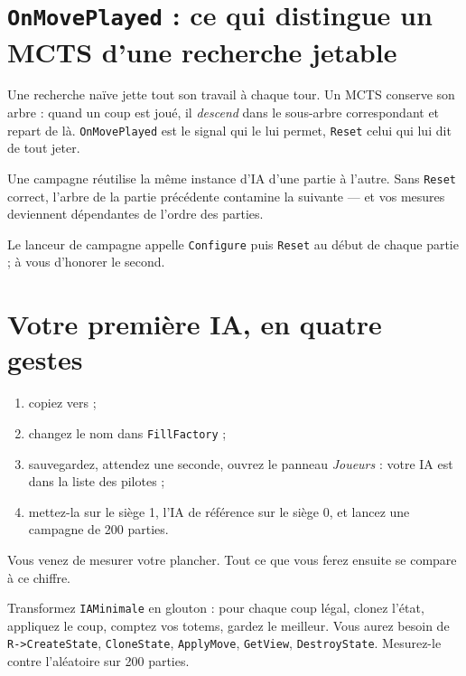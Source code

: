 \section{\texttt{OnMovePlayed} : ce qui distingue un MCTS d'une recherche jetable}

Une recherche naïve jette tout son travail à chaque tour. Un MCTS conserve son
arbre : quand un coup est joué, il \emph{descend} dans le sous-arbre
correspondant et repart de là. \texttt{OnMovePlayed} est le signal qui le lui
permet, \texttt{Reset} celui qui lui dit de tout jeter.

\begin{nkpiege}
Une campagne réutilise la même instance d'IA d'une partie à l'autre. Sans
\texttt{Reset} correct, l'arbre de la partie précédente contamine la suivante — et
vos mesures deviennent dépendantes de l'ordre des parties.

Le lanceur de campagne appelle \texttt{Configure} puis \texttt{Reset} au début de
chaque partie ; à vous d'honorer le second.
\end{nkpiege}

\section{Votre première IA, en quatre gestes}

\begin{enumerate}
  \item copiez  vers
         ;
  \item changez le nom dans \texttt{FillFactory} ;
  \item sauvegardez, attendez une seconde, ouvrez le panneau \emph{Joueurs} :
        votre IA est dans la liste des pilotes ;
  \item mettez-la sur le siège 1, l'IA de référence sur le siège 0, et lancez une
        campagne de 200 parties.
\end{enumerate}

Vous venez de mesurer votre plancher. Tout ce que vous ferez ensuite se compare à
ce chiffre.

\begin{nkexo}[1 — Le glouton]
Transformez \texttt{IAMinimale} en glouton : pour chaque coup légal, clonez
l'état, appliquez le coup, comptez vos totems, gardez le meilleur. Vous aurez
besoin de \texttt{R->CreateState}, \texttt{CloneState}, \texttt{ApplyMove},
\texttt{GetView}, \texttt{DestroyState}. Mesurez-le contre l'aléatoire sur 200
parties.
\end{nkexo}

